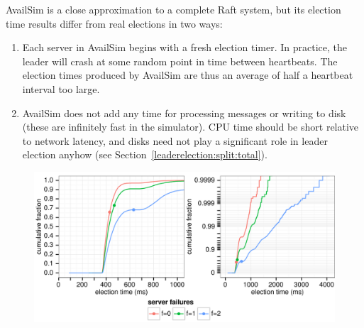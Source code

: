 AvailSim is a close approximation to a complete Raft system, but its
election time results differ from real elections in two ways:
%
\begin{enumerate}
%
\item Each server in AvailSim begins with a fresh election timer. In
practice, the leader will crash at some random point in time between
heartbeats. The election times produced by AvailSim are thus an average
of half a heartbeat interval too large.
%
\item AvailSim does not add any time for processing messages or writing
to disk (these are infinitely fast in the simulator). CPU time should be
short relative to network latency, and disks need not play a significant
role in leader election anyhow (see
Section~\ref{leaderelection:split:total}).
%
\end{enumerate}

\begin{figure}[p]
\centering
\includegraphics{leaderelection/multi-submission-failures}
\vspace{-4ex}
\label{fig:leaderelection:simulation:dist:submission-failures}
\end{figure}

